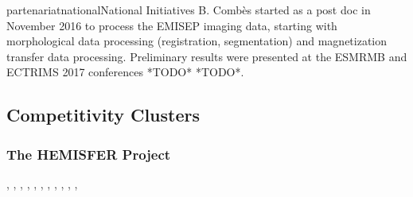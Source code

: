 \documentclass{ra2018}
\begin{document}
\begin{module}{partenariat}{national}{National Initiatives}
B. Combès started as a post doc in November 2016 to process the EMISEP imaging data, starting with
morphological data processing (registration, segmentation) and magnetization
transfer data processing. Preliminary results were presented at the ESMRMB and ECTRIMS 2017 conferences *TODO* *TODO*. 

        \subsection{Competitivity Clusters}
        
        \subsubsection{The HEMISFER Project}
        \begin{participants}
          , 
          ,
          , 
          ,
          ,
          , 
          , 
          ,
          ,
          ,
          ,
        \end{participants}	
        

\end{module}
\end{document}
